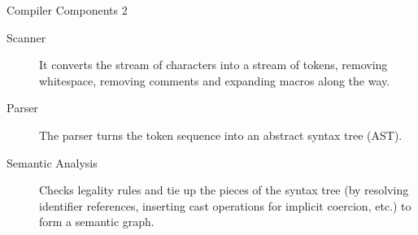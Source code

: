 \documentclass[presentation]{beamer}
\begin{document}
\begin{frame}[label={sec:orgheadline21}]{Compiler Components 2}
\begin{description}
\item[{Scanner}] It converts the stream of characters into a stream of
tokens, removing whitespace, removing comments and expanding
macros along the way.
\item[{Parser}] The parser turns the token sequence into an abstract
syntax tree (AST).
\item[{Semantic Analysis}] Checks legality rules and tie up the pieces
of the syntax tree (by resolving identifier references,
inserting cast operations for implicit coercion, etc.) to
form a semantic graph.
\end{description}
\end{frame}
\end{document}
